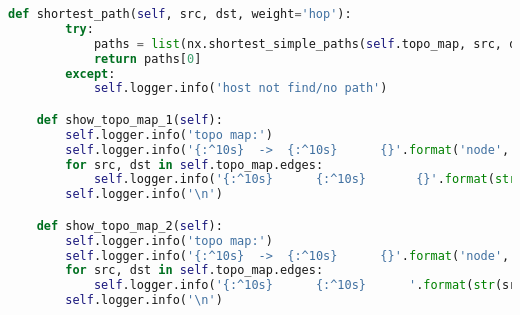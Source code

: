 \documentclass{xjtureport}
\begin{document}
\begin{lstlisting}[language=python]
	def shortest_path(self, src, dst, weight='hop'):
		try:
			paths = list(nx.shortest_simple_paths(self.topo_map, src, dst, weight=weight))
			return paths[0]
		except:
			self.logger.info('host not find/no path')

	def show_topo_map_1(self):
		self.logger.info('topo map:')
		self.logger.info('{:^10s}  ->  {:^10s}      {}'.format('node', 'node','hop'))
		for src, dst in self.topo_map.edges:
			self.logger.info('{:^10s}      {:^10s}       {}'.format(str(src), str(dst),self.topo_map.edges[src,dst]['hop']))
		self.logger.info('\n')

	def show_topo_map_2(self):
		self.logger.info('topo map:')
		self.logger.info('{:^10s}  ->  {:^10s}      {}'.format('node', 'node','delay'))
		for src, dst in self.topo_map.edges:
			self.logger.info('{:^10s}      {:^10s}      '.format(str(src), 			str(dst))+'%.1f'%self.topo_map.edges[src,dst]['delay']+'ms')
		self.logger.info('\n')
\end{lstlisting}
\end{document}
